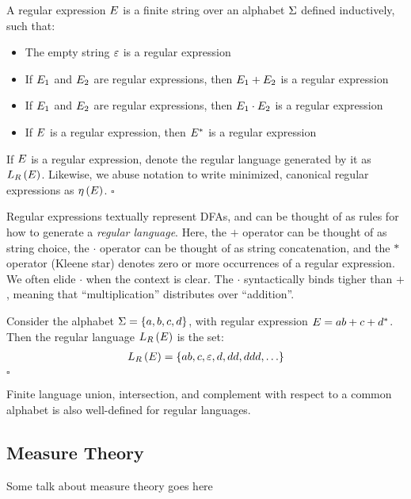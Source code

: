 \begin{definition}
  A regular expression \(E\)
  is a finite string over an alphabet \(\Sigma\)
  defined inductively, such that:
  \begin{itemize}
    \item
      The empty string \(\varepsilon\) is a regular expression

    \item
      If \(E_1\) and \(E_2\) are regular expressions,
      then \(E_1 + E_2\) is a regular expression

    \item
      If \(E_1\) and \(E_2\) are regular expressions,
      then \(E_1 \cdot E_2\) is a regular expression

    \item
      If \(E\) is a regular expression,
      then \(E^\ast\) is a regular expression
  \end{itemize}
  If \(E\) is a regular expression, denote the 
  regular language generated by it as \(L_{R}\left(E\right)\).
  Likewise, we abuse notation to write minimized, canonical
  regular expressions as \(\eta\left(E\right)\).
  \hfill\(\square\)
\end{definition}

Regular expressions textually represent DFAs, and can be thought of
as rules for how to generate a \textit{regular language}.
Here, the \(+\) operator can be thought of as string choice,
the \(\cdot\) operator can be thought of as string concatenation,
and the \(\ast\) operator (Kleene star) denotes zero or more occurrences
of a regular expression.
We often elide \(\cdot\) when the context is clear.
The \(\cdot\) syntactically
binds tigher than \(+\), meaning that ``multiplication''
distributes over ``addition''.

\begin{example}
  Consider the alphabet \(\Sigma = \left\{a, b, c, d\right\}\),
  with regular expression \(E = ab + c + d^\ast\).
  Then the regular language \(L_{R}\left(E\right)\) is the set:
  \begin{align*}
    L_{R}\left(E\right) =
      \left\{ab, c, \varepsilon, d, dd, ddd, \ldots\right\}
  \end{align*}
  \hfill\(\square\)
\end{example}

Finite language union, intersection, and complement
with respect to a common alphabet
is also well-defined for regular languages.




\subsection{Measure Theory}
Some talk about measure theory goes here


